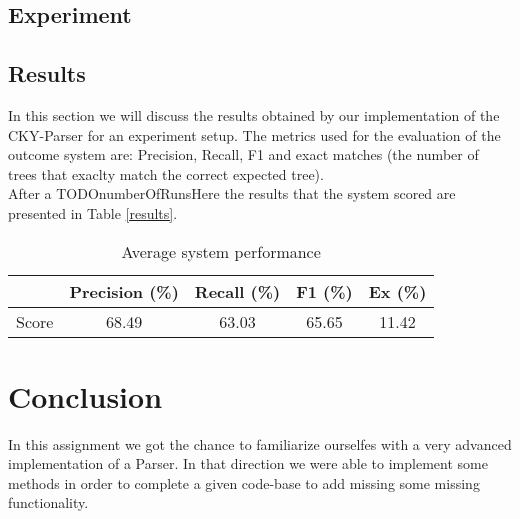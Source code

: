 \documentclass[11pt]{article}
\begin{document}
\subsection{Experiment}


\subsection{Results}
In this section we will discuss the results obtained by our implementation of the CKY-Parser for an experiment setup. The metrics used for the evaluation of the outcome system are: Precision, Recall, F1 and exact matches (the number of trees that exaclty match the correct expected tree).\\
After a TODOnumberOfRunsHere the results that the system scored are presented in Table \ref{results}.

\begin{center}\begin{table}
	\begin{tabular}{|c||c|c|c|c|}
	\hline
		 	  & Precision (\%) & Recall (\%) & F1 (\%) & Ex (\%)\\
	\hline
		Score & 68.49          & 63.03       & 65.65    & 11.42\\
	\hline
	\end{tabular}
	\caption{Average system performance}
	\end{table}
\label{results}\end{center}

\section{Conclusion}
In this assignment we got the chance to familiarize ourselfes with a very advanced implementation of a Parser. In that direction we were able to implement some methods in order to complete a given code-base to add missing some missing functionality. %
\end{document}

